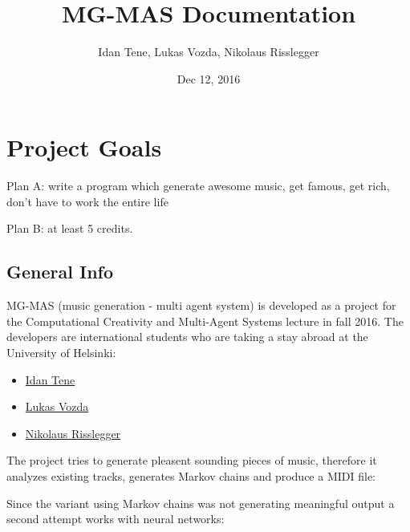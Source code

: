 \documentclass[letterpaper,10pt,english]{sphinxmanual}
\title{MG-MAS Documentation}
\date{Dec 12, 2016}
\author{Idan Tene, Lukas Vozda, Nikolaus Risslegger}
\begin{document}
\maketitle
\sphinxtableofcontents
{}\label{index::doc}

\begin{quote}
\label{goals:goals}\end{quote}


\chapter{Project Goals}
\label{goals::doc}\label{goals:mg-mas-s-documentation}\label{goals:goals}\label{goals:project-goals}
Plan A: write a program which generate awesome music, get famous, get rich, don't have to work the entire life

Plan B: at least 5 credits.


\section{General Info}
\label{goals:general-info}
MG-MAS (music generation - multi agent system) is developed as a project for the Computational Creativity and Multi-Agent Systems lecture in fall 2016. The developers are international students who are taking a stay abroad at the University of Helsinki:
\begin{itemize}
\item {} 
\href{mailto:tene@helsinki.fi}{Idan Tene}

\item {} 
\href{mailto:vozda@helsinki.fi}{Lukas Vozda}

\item {} 
\href{mailto:risslegg@helsinki.fi}{Nikolaus Risslegger}

\end{itemize}

The project tries to generate pleasent sounding pieces of music, therefore it analyzes existing tracks, generates
Markov chains and produce a MIDI file:

\begin{sphinxVerbatim}[commandchars=\\\{\}]
\end{sphinxVerbatim}

Since the variant using Markov chains was not generating meaningful output a second attempt works with neural networks:
\end{document}
